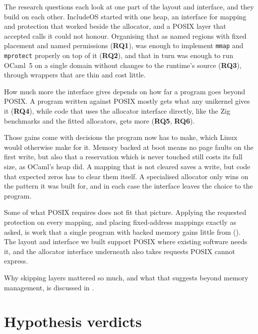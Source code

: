 \documentclass[12pt]{report}
\newcommand{\fullref}[1]{\Cref{#1}}
\renewcommand{\_}{\origunderscore\allowbreak}
\begin{document}
The research questions each look at one part of the layout and interface, and they build on each other. IncludeOS started with one heap, an interface for mapping and protection that worked beside the allocator, and a POSIX layer that accepted calls it could not honour. Organising that as named regions with fixed placement and named permissions (\textbf{RQ1}), was enough to implement \texttt{mmap} and \texttt{mprotect} properly on top of it (\textbf{RQ2}), and that in turn was enough to run OCaml~5 on a single domain without changes to the runtime's source (\textbf{RQ3}), through wrappers that are thin and cost little.

How much more the interface gives depends on how far a program goes beyond POSIX. A program written against POSIX mostly gets what any unikernel gives it (\textbf{RQ4}), while code that uses the allocator interface directly, like the Zig benchmarks and the fitted allocators, gets more (\textbf{RQ5}, \textbf{RQ6}).

Those gains come with decisions the program now has to make, which Linux would otherwise make for it. Memory backed at boot means no page faults on the first write, but also that a reservation which is never touched still costs its full size, as OCaml's heap did. A mapping that is not cleared saves a write, but code that expected zeros has to clear them itself. A specialised allocator only wins on the pattern it was built for, and in each case the interface leaves the choice to the program.

Some of what POSIX requires does not fit that picture. Applying the requested protection on every mapping, and placing fixed-address mappings exactly as asked, is work that a single program with backed memory gains little from (\fullref{sec:design-ocaml}). The layout and interface we built support POSIX where existing software needs it, and the allocator interface underneath also takes requests POSIX cannot express.

Why skipping layers mattered so much, and what that suggests beyond memory management, is discussed in \fullref{sec:discussion-design}.

\section{Hypothesis verdicts}
\label{sec:hypothesis-verdicts}
\end{document}
